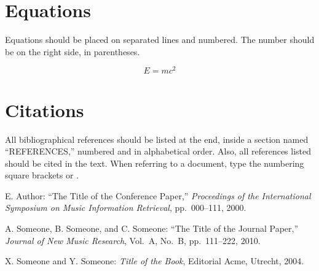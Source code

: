 \documentclass{article}
\begin{document}
\section{Equations}

Equations should be placed on separated lines and numbered.
The number should be on the right side, in parentheses.

\begin{equation}
E=mc^{2}
\end{equation}

\section{Citations}

All bibliographical references should be listed at the end, 
inside a section named ``REFERENCES,'' numbered and in alphabetical order. 
Also, all references listed should be cited in the text. 
When referring to a document, type the numbering square brackets
\cite{Author:00} or \cite{Author:00,Someone:10,Someone:04}.

\begin{thebibliography}{citations}

E. Author:
``The Title of the Conference Paper,''
{\it Proceedings of the International Symposium 
on Music Information Retrieval}, pp.~000--111, 2000.

A. Someone, B. Someone, and C. Someone:
``The Title of the Journal Paper,''
{\it Journal of New Music Research}, 
Vol.~A, No.~B, pp.~111--222, 2010.

X. Someone and Y. Someone:
{\it Title of the Book},
Editorial Acme, Utrecht, 2004.

\end{thebibliography}

%
\end{document}

